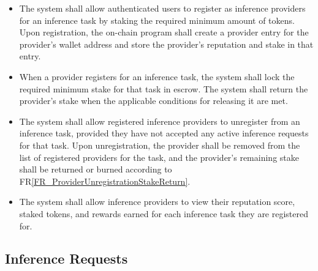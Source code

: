 \documentclass[12pt]{article}
\newcounter{reqnum} %
\newcommand{\rref}[1]{FR\ref{#1}}
\begin{document}
\noindent \begin{itemize}

\item[FR\refstepcounter{reqnum}\thereqnum \label{FR_InferenceTaskRegistration}:] The system shall allow authenticated users to register as inference providers for an inference task by staking the required minimum amount of tokens. Upon registration, the on-chain program shall create a provider entry for the provider's wallet address and store the provider's reputation and stake in that entry.

\item[FR\refstepcounter{reqnum}\thereqnum \label{FR_InferenceTaskRegistrationStaking}:] When a provider registers for an inference task, the system shall lock the required minimum stake for that task in escrow. The system shall return the provider's stake when the applicable conditions for releasing it are met.

\item[FR\refstepcounter{reqnum}\thereqnum \label{FR_ProviderWillingUnregistration}:] The system shall allow registered inference providers to unregister from an inference task, provided they have not accepted any active inference requests for that task. Upon unregistration, the provider shall be removed from the list of registered providers for the task, and the provider's remaining stake shall be returned or burned according to \rref{FR_ProviderUnregistrationStakeReturn}.

\item[FR\refstepcounter{reqnum}\thereqnum \label{FR_ProviderDashboard}:] The system shall allow inference providers to view their reputation score, staked tokens, and rewards earned for each inference task they are registered for.

\end{itemize}

\subsection{Inference Requests}
\end{document}
